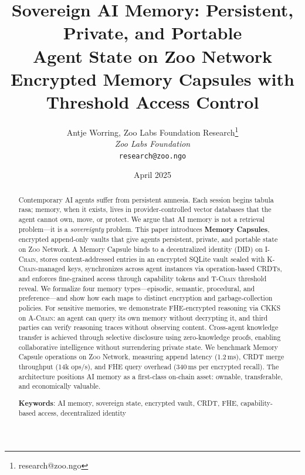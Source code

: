\documentclass[11pt,letterpaper]{article}
\title{\textbf{Sovereign AI Memory: Persistent, Private, and Portable\\Agent State on Zoo Network}\\
\large Encrypted Memory Capsules with Threshold Access Control}
\author{
Antje Worring, Zoo Labs Foundation Research\thanks{research@zoo.ngo}\\
\textit{Zoo Labs Foundation}\\
\texttt{research@zoo.ngo}
}
\date{April 2025}
\theoremstyle{definition}
\theoremstyle{remark}
\newcommand{\Zoo}{\textsc{Zoo}}
\newcommand{\AChain}{\textsc{A-Chain}}
\newcommand{\IChain}{\textsc{I-Chain}}
\newcommand{\KChain}{\textsc{K-Chain}}
\newcommand{\TChain}{\textsc{T-Chain}}
\newcommand{\CKKS}{\textsc{CKKS}}
\newcommand{\CRDT}{\textsc{CRDT}}
\newcommand{\DID}{\textsc{DID}}
\newcommand{\FHE}{\textsc{FHE}}
\begin{document}
\zoocoverpage

\begin{abstract}
Contemporary AI agents suffer from persistent amnesia. Each session begins tabula rasa; memory, when it exists, lives in provider-controlled vector databases that the agent cannot own, move, or protect. We argue that AI memory is not a retrieval problem---it is a \emph{sovereignty} problem. This paper introduces \textbf{Memory Capsules}, encrypted append-only vaults that give agents persistent, private, and portable state on \Zoo{} Network. A Memory Capsule binds to a decentralized identity (\DID{}) on \IChain{}, stores content-addressed entries in an encrypted SQLite vault sealed with \KChain{}-managed keys, synchronizes across agent instances via operation-based \CRDT{}s, and enforces fine-grained access through capability tokens and \TChain{} threshold reveal. We formalize four memory types---episodic, semantic, procedural, and preference---and show how each maps to distinct encryption and garbage-collection policies. For sensitive memories, we demonstrate \FHE{}-encrypted reasoning via \CKKS{} on \AChain{}: an agent can query its own memory without decrypting it, and third parties can verify reasoning traces without observing content. Cross-agent knowledge transfer is achieved through selective disclosure using zero-knowledge proofs, enabling collaborative intelligence without surrendering private state. We benchmark Memory Capsule operations on \Zoo{} Network, measuring append latency (1.2\,ms), \CRDT{} merge throughput (14k ops/s), and \FHE{} query overhead (340\,ms per encrypted recall). The architecture positions AI memory as a first-class on-chain asset: ownable, transferable, and economically valuable.

\textbf{Keywords}: AI memory, sovereign state, encrypted vault, CRDT, FHE, capability-based access, decentralized identity
\end{abstract}

\tableofcontents
\newpage














\end{document}
